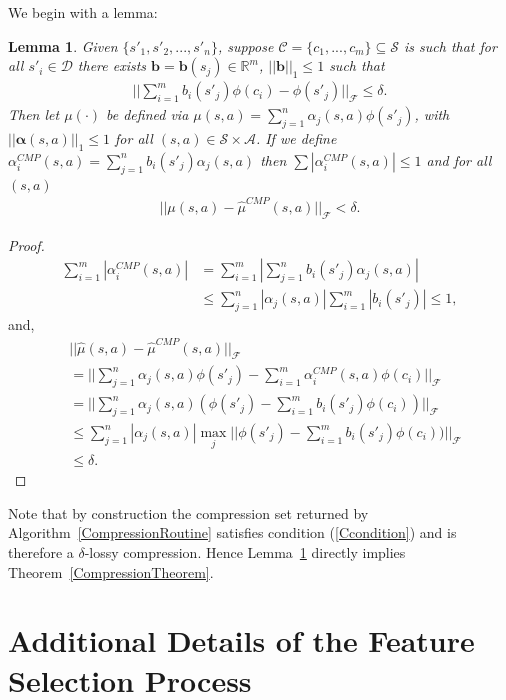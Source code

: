 \documentclass[letterpaper]{article}
\newtheorem{lemma}[theorem]{Lemma}
\newcommand{\cD}{{\mathcal D}}
\newcommand{\cC}{{\mathcal C}}
\newcommand{\cF}{{\mathcal F}}
\newcommand{\cA}{{\mathcal A}}
\newcommand{\cS}{{\mathcal S}}
\newcommand{\balpha}{{\bm \alpha}}
\newcommand{\R}{{\mathbb R}}
\newcommand{\nn}{\nonumber}
\begin{document}
We begin with a lemma:

\begin{lemma}\label{CMPlemma} Given $\{s'_1,s'_2,...,s'_n\}$, suppose $\cC = \{ c_1,...,c_m \}\subseteq \cS$ is such that for all $s'_i\in\cD$ there exists ${\bm b} = {\bm b}(s_j)\in\R^m$, $||\bm b||_1\le 1$ such that
\begin{align}
||\sum_{i=1}^m b_i(s'_j) \phi(c_i) - \phi(s'_j)||_{\cF} \le \delta. \label{Ccondition}
\end{align}
Then let $\mu(\cdot)$ be defined via $\mu(s,a) = \sum_{j=1}^n \alpha_j(s,a) \phi(s'_j)$, with $||\balpha(s,a)||_1\le 1$ for all $(s,a)\in\cS\times\cA$. 
If we define $\alpha^{CMP}_i(s,a)=\sum_{j=1}^n b_i(s'_j) \alpha_j(s,a)$ then $\sum |\alpha^{CMP}_i(s,a)|\le 1$ and for all $(s,a)$
\begin{align}
||\mu(s,a) - \hat\mu^{CMP}(s,a)||_\cF < \delta. \nn
\end{align}
\end{lemma}

\begin{proof}
\begin{align}
\sum_{i=1}^m |\alpha^{CMP}_i(s,a)| & = \sum_{i=1}^m |\sum_{j=1}^n b_i(s'_j) \alpha_j(s,a)| \nn\\
&\le \sum_{j=1}^n|\alpha_j(s,a)| \sum_{i=1}^m  |b_i(s'_j)| \le 1, \nn
\end{align}
and,
\begin{align}
&||\hat\mu(s,a) - \hat\mu^{CMP}(s,a)||_\cF \nn\\
&= || \sum_{j=1}^n \alpha_j(s,a) \phi(s'_j) - \sum_{i=1}^m \alpha^{CMP}_i(s,a) \phi(c_i) ||_\cF \nn\\
&= || \sum_{j=1}^n \alpha_j(s,a)( \phi(s'_j) - \sum_{i=1}^m b_i(s'_j)  \phi(c_i)) ||_\cF \nn\\
&\le \sum_{j=1}^n |\alpha_j(s,a)| \max_j || \phi(s'_j) - \sum_{i=1}^m b_i(s'_j)  \phi(c_i)) ||_\cF\nn\\
&\le \delta.\nn
\end{align}
\end{proof}

Note that by construction the compression set returned by Algorithm~\ref{CompressionRoutine} satisfies condition (\ref{Ccondition}) and is therefore a $\delta$-lossy compression. Hence Lemma~\ref{CMPlemma} directly implies Theorem~\ref{CompressionTheorem}.

\section{Additional Details of the Feature Selection Process}\label{MatchingPursuit}
\end{document}
